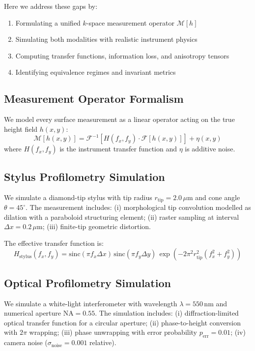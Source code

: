 \documentclass[review]{elsarticle}
\begin{document}
Here we address these gaps by:

\begin{enumerate}
    \item Formulating a unified $k$-space measurement operator $\mathcal{M}[h]$
    \item Simulating both modalities with realistic instrument physics
    \item Computing transfer functions, information loss, and anisotropy tensors
    \item Identifying equivalence regimes and invariant metrics
\end{enumerate}


\subsection{Measurement Operator Formalism}
We model every surface measurement as a linear operator acting on the
true height field $h(x,y)$:
\begin{equation}
    \mathcal{M}[h(x,y)] = \mathcal{F}^{-1}[H(f_x,f_y) \cdot \mathcal{F}[h(x,y)]] + \eta(x,y)
\end{equation}
where $H(f_x,f_y)$ is the instrument transfer function and $\eta$ is additive noise.

\subsection{Stylus Profilometry Simulation}
We simulate a diamond-tip stylus with tip radius $r_\mathrm{tip} = 2.0\,\mu\mathrm{m}$
and cone angle $\theta = 45^\circ$.
The measurement includes:
(i) morphological tip convolution modelled as dilation with a paraboloid structuring element;
(ii) raster sampling at interval $\Delta x = 0.2\,\mu\mathrm{m}$;
(iii) finite-tip geometric distortion.

The effective transfer function is:
\begin{equation}
    H_\mathrm{stylus}(f_x,f_y) = \mathrm{sinc}(\pi f_x \Delta x)\,\mathrm{sinc}(\pi f_y \Delta y)\,
    \exp(-2\pi^2 r_\mathrm{tip}^2 (f_x^2 + f_y^2))
\end{equation}

\subsection{Optical Profilometry Simulation}
We simulate a white-light interferometer with wavelength $\lambda = 550\,\mathrm{nm}$
and numerical aperture $\mathrm{NA} = 0.55$.
The simulation includes:
(i) diffraction-limited optical transfer function for a circular aperture;
(ii) phase-to-height conversion with $2\pi$ wrapping;
(iii) phase unwrapping with error probability $p_\mathrm{err} = 0.01$;
(iv) camera noise ($\sigma_\mathrm{noise} = 0.001$ relative).
\end{document}

